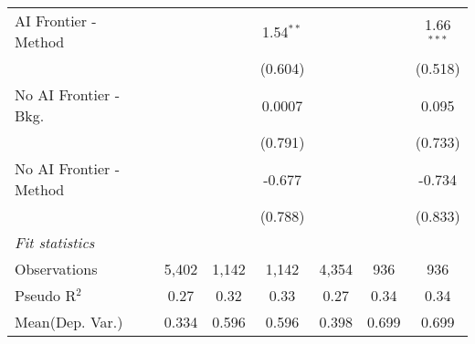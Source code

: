 \begin{tabular}{lcccccc}
   AI Frontier - Method    &               &              & 1.54$^{**}$  &               &              & 1.66$^{***}$\\   
                           &               &              & (0.604)      &               &              & (0.518)\\   
   No AI Frontier - Bkg.   &               &              & 0.0007       &               &              & 0.095\\   
                           &               &              & (0.791)      &               &              & (0.733)\\   
   No AI Frontier - Method &               &              & -0.677       &               &              & -0.734\\   
                           &               &              & (0.788)      &               &              & (0.833)\\   
   \midrule
   \emph{Fit statistics}\\
   Observations            & 5,402         & 1,142        & 1,142        & 4,354         & 936          & 936\\  
   Pseudo R$^2$            & 0.27          & 0.32         & 0.33         & 0.27          & 0.34         & 0.34\\  
Mean(Dep. Var.) & 0.334 & 0.596 & 0.596 & 0.398 & 0.699 & 0.699 \\
   

\end{tabular}
